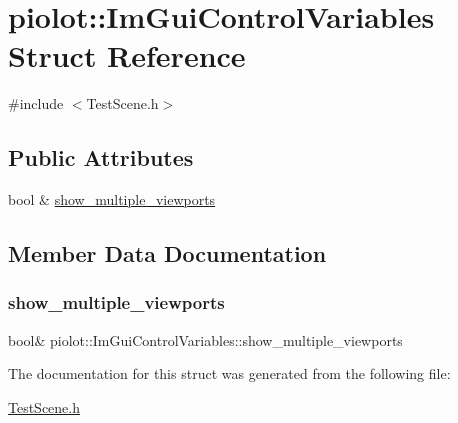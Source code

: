\hypertarget{structpiolot_1_1_im_gui_control_variables}{}\section{piolot\+:\+:Im\+Gui\+Control\+Variables Struct Reference}
\label{structpiolot_1_1_im_gui_control_variables}


{\ttfamily \#include $<$Test\+Scene.\+h$>$}

\subsection*{Public Attributes}
\begin{DoxyCompactItemize}
\item 
bool \& \mbox{\hyperlink{structpiolot_1_1_im_gui_control_variables_ae4b05c60d0566aae16e8ab68980b473d}{show\+\_\+multiple\+\_\+viewports}}
\end{DoxyCompactItemize}


\subsection{Member Data Documentation}
\mbox{\label{structpiolot_1_1_im_gui_control_variables_ae4b05c60d0566aae16e8ab68980b473d}} 
\subsubsection{\texorpdfstring{show\+\_\+multiple\+\_\+viewports}{show\_multiple\_viewports}}
{\footnotesize\ttfamily bool\& piolot\+::\+Im\+Gui\+Control\+Variables\+::show\+\_\+multiple\+\_\+viewports}



The documentation for this struct was generated from the following file\+:\begin{DoxyCompactItemize}
\item 
\mbox{\hyperlink{_test_scene_8h}{Test\+Scene.\+h}}\end{DoxyCompactItemize}
